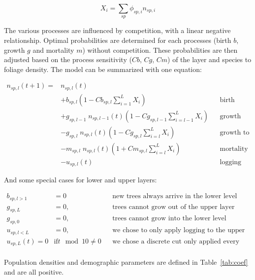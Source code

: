 \documentclass{article}
\begin{document}
\begin{equation}
    X_{i} = \sum_{sp} \phi_{sp,i} n_{sp,i}
\end{equation}

The various processes are influenced by competition, with a linear negative relationship. Optimal probabilities are determined for each processes (birth $b$, growth $g$ and mortality $m$) without competition. These probabilities are then adjusted based on the process sensitivity ($Cb$, $Cg$, $Cm$) of the layer and species to foliage density. The model can be summarized with one equation:

\begin{equation}
\begin{aligned}
    n_{sp,l}(t+1) = {} & n_{sp,l}(t) \\
    & + b_{sp,l} (1 - Cb_{sp,l} \sum_{i = 1}^{L} X_{i}) &&\text{birth} \\
    & + g_{sp,l - 1} \; n_{sp,l-1}(t) (1 - Cg_{sp,l-1} \sum_{i = l-1}^{L} X_{i}) &&\text{growth from lower level}\\
    & - g_{sp,l} \; n_{sp,l}(t) (1 - Cg_{sp,l} \sum_{i = l}^{L} X_{i}) &&\text{growth to upper level}\\
    & - m_{sp,l} \; n_{sp,l}(t) (1 + Cm_{sp,l} \sum_{i = l}^{L} X_{i}) &&\text{mortality} \\
    & - u_{sp, l}(t) &&\text{logging}
\end{aligned}
\label{eq:model_general}
\end{equation}

And some special cases for lower and upper layers:

\begin{equation}
\begin{aligned}
    b_{sp,l>1} & = 0 && \text{new trees always arrive in the lower level} \\
    g_{sp,L} & = 0, && \text{trees cannot grow out of the upper layer} \\
    g_{sp,0} & = 0, && \text{trees cannot grow into the lower level} \\
    u_{sp,l<L} & = 0, && \text{we chose to only apply logging to the upper level} \\
    u_{sp,L}(t) = 0 & \text{if} t \mod 10 \neq 0 && \text{we chose a discrete cut only applied every ten years} \\ 
\end{aligned}
\label{eq:model_conditions}
\end{equation}

Population densities and demographic parameters are defined in Table~\ref{tab:coef} and are all positive.
\end{document}
